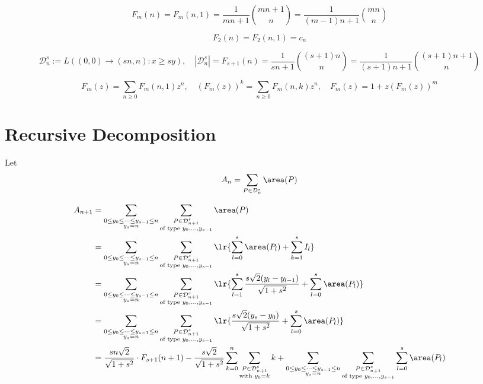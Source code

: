\documentclass[12pt]{article}
\begin{document}
\[
    F_{m}(n) = F_{m}(n,1) = \frac{1}{mn+1}\binom{mn+1}{n} = \frac{1}{(m-1)n+1}\binom{mn}{n}
\]

\[
    F_{2}(n) = F_{2}(n,1) = c_{n}
\]

\[
    \mathcal{D}_{n}^{s}:=L((0,0)\to(sn,n): x\geq sy), \quad |\mathcal{D}_{n}^{s}| = F_{s+1}(n) = \frac{1}{sn+1}\binom{(s+1)n}{n} = \frac{1}{(s+1)n+1}\binom{(s+1)n+1}{n}
\]

\[
    F_{m}(z) = \sum_{n\geq0}F_{m}(n,1)z^{n},\quad (F_{m}(z))^{k}= \sum_{n\geq 0} F_{m}(n,k)z^{n},\quad F_{m}(z) = 1+z(F_{m}(z))^{m}
\]

\section{Recursive Decomposition}

Let 
\[
    A_{n} = \sum_{P\in \mathcal{D}_{n}^{s}} \area(P)
\]

\begin{align*}
    A_{n+1} &= \sum_{\substack{0\leq y_{0}\leq \cdots\leq y_{s-1}\leq n\\y_{s}=n}} \sum_{\substack{P\in \mathcal{D}_{n+1}^{s}\\\text{of type }y_{0},\ldots, y_{s-1}}} \area(P) \\
    &= \sum_{\substack{0\leq y_{0}\leq \cdots\leq y_{s-1}\leq n\\y_{s}=n}} \sum_{\substack{P\in \mathcal{D}_{n+1}^{s}\\\text{of type }y_{0},\ldots, y_{s-1}}} \lr{\sum_{l=0}^{s}\area(P_{l}) + \sum_{k=1}^{s}I_{l}}  \\
    &= \sum_{\substack{0\leq y_{0}\leq \cdots\leq y_{s-1}\leq n\\y_{s}=n}} \sum_{\substack{P\in \mathcal{D}_{n+1}^{s}\\\text{of type }y_{0},\ldots, y_{s-1}}} \lr{\sum_{l=1}^{s}\frac{s \sqrt{2}(y_{l}-y_{l-1})}{\sqrt{1+s^{2}}} + \sum_{l=0}^{s}\area(P_{l})}  \\
    &= \sum_{\substack{0\leq y_{0}\leq \cdots\leq y_{s-1}\leq n\\y_{s}=n}} \sum_{\substack{P\in \mathcal{D}_{n+1}^{s}\\\text{of type }y_{0},\ldots, y_{s-1}}} \lr{\frac{s \sqrt{2}(y_{s}-y_{0})}{\sqrt{1+s^{2}}} + \sum_{l=0}^{s}\area(P_{l})}  \\
    &= \frac{sn \sqrt{2}}{\sqrt{1+s^{2}}}\cdot F_{s+1}(n+1) - \frac{s \sqrt{2}}{\sqrt{1+s^{2}}}\sum_{k=0}^{n}\sum_{\substack{P\in \mathcal{D}_{n+1}^{s}\\\text{with }y_{0}=k}}k + \sum_{\substack{0\leq y_{0}\leq \cdots\leq y_{s-1}\leq n\\y_{s}=n}} \sum_{\substack{P\in \mathcal{D}_{n+1}^{s}\\\text{of type }y_{0},\ldots, y_{s-1}}}  \sum_{l=0}^{s}\area(P_{l})  \\
\end{align*}
\end{document}
